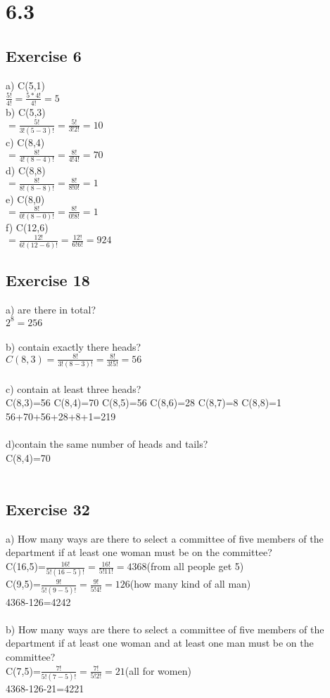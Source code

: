 \documentclass[12pt]{article}
\begin{document}
\section*{6.3}
\subsection*{Exercise 6}
a) C(5,1)\\
$\frac{5!}{4!}=\frac{5*4!}{4!}=5$\\
b) C(5,3)\\
$=\frac{5!}{3!(5-3)!}=\frac{5!}{3!2!}=10$\\
c) C(8,4)\\
$=\frac{8!}{4!(8-4)!}=\frac{8!}{4!4!}=70$\\
d) C(8,8)\\
$=\frac{8!}{8!(8-8)!}=\frac{8!}{8!0!}=1$\\
e) C(8,0)\\
$=\frac{8!}{0!(8-0)!}=\frac{8!}{0!8!}=1$\\
f) C(12,6)\\
$=\frac{12!}{6!(12-6)!}=\frac{12!}{6!6!}=924$\\
\subsection*{Exercise 18}
a) are there in total?\\
$2^8=256$\\
\\
b) contain exactly there heads?\\
$C(8,3)=\frac{8!}{3!(8-3)!}=\frac{8!}{3!5!}=56$\\
\\
c) contain at least three heads?\\
C(8,3)=56 C(8,4)=70 C(8,5)=56 C(8,6)=28 C(8,7)=8 C(8,8)=1\\
56+70+56+28+8+1=219\\
\\
d)contain the same number of heads and tails?\\
C(8,4)=70\\
\\
\subsection*{Exercise 32}
a) How many ways are there to select a committee of five members of the department if at least one woman must be on the committee?\\
C(16,5)=$\frac{16!}{5!(16-5)!}=\frac{16!}{5!11!}=4368$(from all people get 5)\\
C(9,5)=$\frac{9!}{5!(9-5)!}=\frac{9!}{5!4!}=126$(how many kind of all man)\\
4368-126=4242\\
\\
b) How many ways are there to select a committee of five members of the department if at least one woman and at least one man must be on the committee?\\
C(7,5)=$\frac{7!}{5!(7-5)!}=\frac{7!}{5!2!}=21$(all for women)\\
4368-126-21=4221\\
\\
\end{document}
